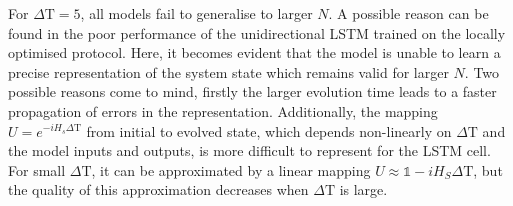 For $\Delta \mathrm{T} = 5$, all models fail to generalise to larger $N$.
A possible reason can be found in the poor performance of the unidirectional LSTM trained on the locally optimised protocol.
Here, it becomes evident that the model is unable to learn a precise representation of the system state which remains valid for larger $N$.
Two possible reasons come to mind, firstly the larger evolution time leads to a faster propagation of errors in the representation.
Additionally, the mapping $U = e^{-i H_s \Delta \mathrm{T}}$ from initial to evolved state, which depends non-linearly on $\Delta \mathrm{T}$ and the model inputs and outputs, is more difficult to represent for the LSTM cell.
For small $\Delta \mathrm{T}$, it can be approximated by a linear mapping $U \approx \mathds{1} - i H_S \Delta \mathrm{T}$, but the quality of this approximation decreases when $\Delta \mathrm{T}$ is large.